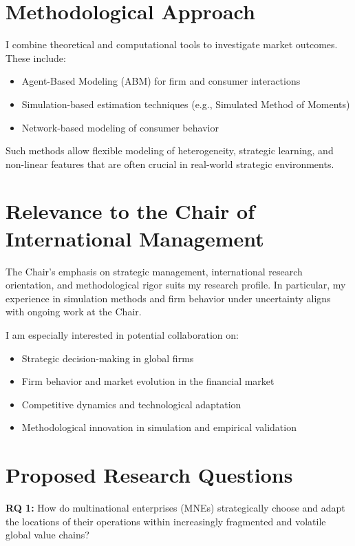 \documentclass[11pt,a4paper]{article}
\begin{document}
\section*{Methodological Approach}
I combine theoretical and computational tools to investigate market outcomes. These include:
\begin{itemize}
  \item Agent-Based Modeling (ABM) for firm and consumer interactions
  \item Simulation-based estimation techniques (e.g., Simulated Method of Moments)
  \item Network-based modeling of consumer behavior
\end{itemize}

Such methods allow flexible modeling of heterogeneity, strategic learning, and non-linear features that are often crucial in real-world strategic environments.

\section*{Relevance to the Chair of International Management}
The Chair's emphasis on strategic management, international research orientation, and methodological rigor suits my research profile. In particular, my experience in simulation methods and firm behavior under uncertainty aligns with ongoing work at the Chair.

I am especially interested in potential collaboration on:
\begin{itemize}
  \item Strategic decision-making in global firms
  \item Firm behavior and market evolution in the financial market
  \item Competitive dynamics and technological adaptation
  \item Methodological innovation in simulation and empirical validation
\end{itemize}

\section*{Proposed Research Questions}
\textbf{RQ 1:} How do multinational enterprises (MNEs) strategically choose and adapt the locations of their operations within increasingly fragmented and volatile global value chains?
\end{document}
